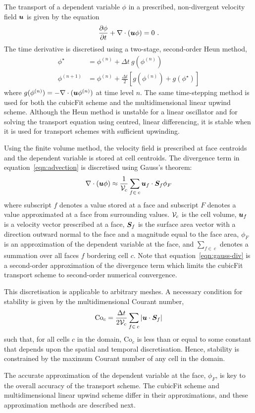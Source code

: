 The transport of a dependent variable $\phi$ in a prescribed, non-divergent velocity field $\bm{u}$ is given by the equation		
\begin{align}		
	\frac{\partial \phi}{\partial t} + \nabla \cdot \left( \bm{u} \phi \right) = 0 \text{ .} \label{eqn:advection}		
\end{align}
The time derivative is discretised using a two-stage, second-order Heun method,
\begin{subequations}
\begin{align}
	\phi^\star &= \phi^{(n)} + \Delta t \: g(\phi^{(n)}) \\
	\phi^{(n+1)} &= \phi^{(n)} + \frac{\Delta t}{2} \left[ g(\phi^{(n)}) + g(\phi^{\star}) \right]
\end{align} \label{eqn:heun}
\end{subequations}
where \(g(\phi^{(n)}) = - \nabla \cdot (\bm{u} \phi^{(n)})\) at time level \(n\).  The same time-stepping method is used for both the cubicFit scheme and the multidimensional linear upwind scheme.
Although the Heun method is unstable for a linear oscillator \citep{durran2013} and for solving the transport equation using centred, linear differencing, it is stable when it is used for transport schemes with sufficient upwinding.

Using the finite volume method, the velocity field is prescribed at face centroids and the dependent variable is stored at cell centroids.  The divergence term in equation~\eqref{eqn:advection} is discretised using Gauss's theorem:
\begin{align}
	\nabla \cdot \left( \bm{u} \phi \right) \approx \frac{1}{\mathcal{V}_c} \sum_{f \in\:c} \bm{u}_f \cdot \bm{S}_f \phi_F \label{eqn:gauss-div}
\end{align}
where subscript $f$ denotes a value stored at a face and subscript $F$ denotes a value approximated at a face from surrounding values.  $\mathcal{V}_c$ is the cell volume, $\bm{u}_f$ is a velocity vector prescribed at a face, $\bm{S}_f$ is the surface area vector with a direction outward normal to the face and a magnitude equal to the face area, $\phi_F$ is an approximation of the dependent variable at the face, and $\sum_{f \in\:c}$ denotes a summation over all faces $f$ bordering cell $c$.
Note that equation~\eqref{eqn:gauss-div} is a second-order approximation of the divergence term which limits the cubicFit transport scheme to second-order numerical convergence.

This discretisation is applicable to arbitrary meshes.  A necessary condition for stability is given by the multidimensional Courant number,
\begin{align}
	\mathrm{Co}_c = \frac{\Delta t}{2 \mathcal{V}_c} \sum_{f \in\: c} \left\lvert \bm{u} \cdot \bm{S}_f \right\rvert \label{eqn:co}
\end{align}
such that, for all cells $c$ in the domain, $\mathrm{Co}_c$ is less than or equal to some constant that depends upon the spatial and temporal discretisation.  Hence, stability is constrained by the maximum Courant number of any cell in the domain.

The accurate approximation of the dependent variable at the face, $\phi_F$, is key to the overall accuracy of the transport scheme. The cubicFit scheme and multidimensional linear upwind scheme differ in their approximations, and these approximation methods are described next.


